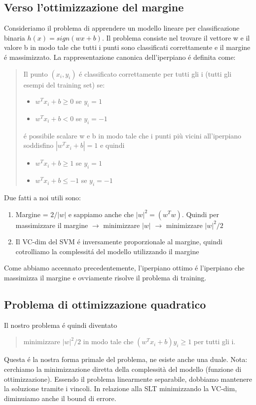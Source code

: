 \documentclass{article}
\begin{document}
\subsection{Verso l'ottimizzazione del margine}
Consideriamo il problema di apprendere un modello lineare per classificazione binaria \newline $h(x)=sign(wx+b)$. Il problema consiste nel trovare il vettore w e il valore b in modo tale che tutti i punti sono classificati correttamente e il margine é massimizzato. \newline
La rappresentazione canonica dell'iperpiano é definita come:
\begin{quote}
    Il punto $(x_i,y_i)$ é classificato correttamente per tutti gli i (tutti gli esempi del training set) se:
    \begin{itemize}
        \item $w^Tx_i+b \geq 0$ se $y_i=1$
        \item $w^Tx_i+b < 0$ se $y_i=-1$
    \end{itemize}
    é possibile scalare w e b in modo tale che i punti più vicini all'iperpiano soddisfino \newline $|w^Tx_i+b|=1$ e quindi
    \begin{itemize}
        \item $w^Tx_i+b \geq 1$ se $y_i=1$
        \item $w^Tx_i+b \leq -1$ se $y_i=-1$
    \end{itemize}
\end{quote}
Due fatti a noi utili sono:
\begin{enumerate}
    \item Margine = $2/|w|$ e sappiamo anche che $|w|^2=(w^Tw)$. \newline
    Quindi per massimizzare il margine $\rightarrow$ minimizzare $|w|$ $\rightarrow$ minimizzare $|w|^2/2$
    \item Il VC-dim del SVM é inversamente proporzionale al margine, quindi cotrolliamo la complessitá del modello utilizzando il margine
\end{enumerate}
Come abbiamo accennato precedentemente, l'iperpiano ottimo é l'iperpiano che massimizza il margine e ovviamente risolve il problema di training. 

\subsection{Problema di ottimizzazione quadratico}
Il nostro problema é quindi diventato
\begin{quote}
    minimizzare $|w|^2/2$ in modo tale che $(w^Tx_i+b)y_i\geq1$ per tutti gli i.
\end{quote}
Questa é la nostra forma primale del problema, ne esiste anche una duale.
Nota: cerchiamo la minimizzazione diretta della complessità del modello (funzione di ottimizzazione). Essendo il problema linearmente separabile, dobbiamo mantenere la soluzione tramite i vincoli. In relazione alla SLT minimizzando la VC-dim, diminuiamo anche il bound di errore.
\end{document}
